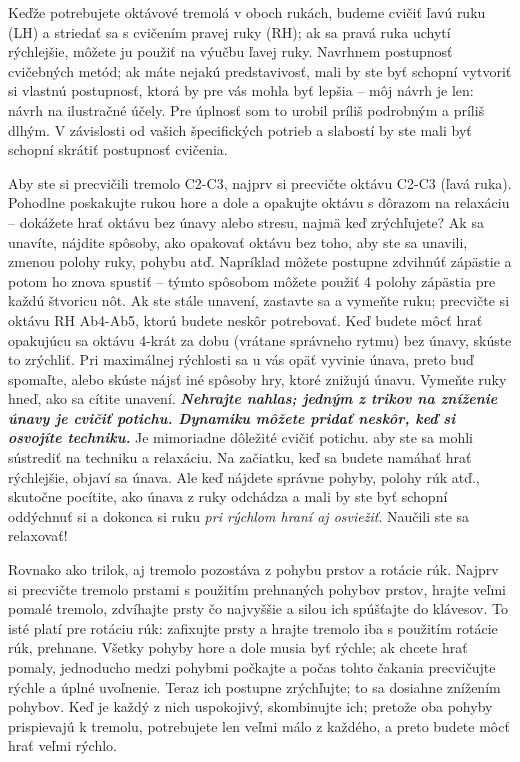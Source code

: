 \documentclass[11pt,a4paper%
]{book}
\begin{document}
Keďže potrebujete oktávové tremolá v oboch rukách, budeme cvičiť ľavú ruku (LH) a striedať sa s cvičením pravej ruky (RH); ak sa pravá ruka uchytí rýchlejšie, môžete ju použiť na výučbu ľavej ruky. Navrhnem postupnosť cvičebných metód; ak máte nejakú predstavivosť, mali by ste byť schopní vytvoriť si vlastnú postupnosť, ktorá by pre vás mohla byť lepšia -- môj návrh je len: návrh na ilustračné účely. Pre úplnosť som to urobil príliš podrobným a príliš dlhým. V závislosti od vašich špecifických potrieb a slabostí by ste mali byť schopní skrátiť postupnosť cvičenia.

Aby ste si precvičili tremolo C2-C3, najprv si precvičte oktávu C2-C3 (ľavá ruka). Pohodlne poskakujte rukou hore a dole a opakujte oktávu s dôrazom na relaxáciu -- dokážete hrať oktávu bez únavy alebo stresu, najmä keď zrýchľujete? Ak sa unavíte, nájdite spôsoby, ako opakovať oktávu bez toho, aby ste sa unavili, zmenou polohy ruky, pohybu atď. Napríklad môžete postupne zdvihnúť zápästie a potom ho znova spustiť -- týmto spôsobom môžete použiť 4 polohy zápästia pre každú štvoricu nôt. Ak ste stále unavení, zastavte sa a vymeňte ruku; precvičte si oktávu RH Ab4-Ab5, ktorú budete neskôr potrebovať. Keď budete môcť hrať opakujúcu sa oktávu 4-krát za dobu (vrátane správneho rytmu) bez únavy, skúste to zrýchliť. Pri maximálnej rýchlosti sa u vás opäť vyvinie únava, preto buď spomaľte, alebo skúste nájsť iné spôsoby hry, ktoré znižujú únavu. Vymeňte ruky hneď, ako sa cítite unavení. \emph{\textbf{Nehrajte nahlas; jedným z trikov na zníženie únavy je cvičiť potichu. Dynamiku môžete pridať neskôr, keď si osvojíte techniku.}} Je mimoriadne dôležité cvičiť potichu. aby ste sa mohli sústrediť na techniku a relaxáciu. Na začiatku, keď sa budete namáhať hrať rýchlejšie, objaví sa únava. Ale keď nájdete správne pohyby, polohy rúk atď., skutočne pocítite, ako únava z ruky odchádza a mali by ste byť schopní oddýchnuť si a dokonca si ruku \emph{pri rýchlom hraní aj osviežiť}. Naučili ste sa relaxovať!

Rovnako ako trilok, aj tremolo pozostáva z pohybu prstov a rotácie rúk. Najprv si precvičte tremolo prstami s použitím prehnaných pohybov prstov, hrajte veľmi pomalé tremolo, zdvíhajte prsty čo najvyššie a silou ich spúšťajte do klávesov. To isté platí pre rotáciu rúk: zafixujte prsty a hrajte tremolo iba s použitím rotácie rúk, prehnane. Všetky pohyby hore a dole musia byť rýchle; ak chcete hrať pomaly, jednoducho medzi pohybmi počkajte a počas tohto čakania precvičujte rýchle a úplné uvoľnenie. Teraz ich postupne zrýchľujte; to sa dosiahne znížením pohybov. Keď je každý z nich uspokojivý, skombinujte ich; pretože oba pohyby prispievajú k tremolu, potrebujete len veľmi málo z každého, a preto budete môcť hrať veľmi rýchlo.
\end{document}
